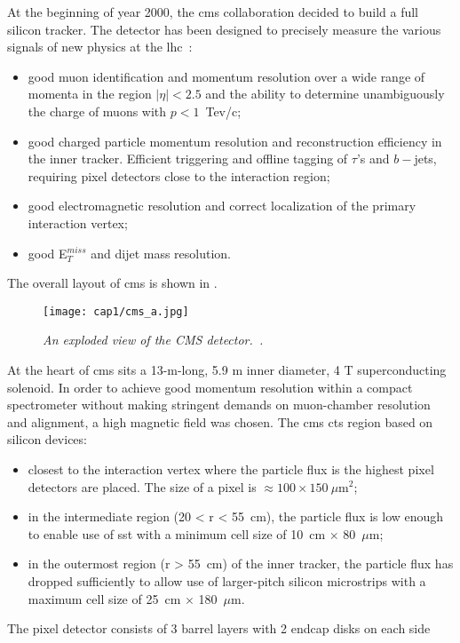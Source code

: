 \hskip 1cm At the beginning of year 2000, the \gls{cms} collaboration decided to
build a full silicon tracker. The detector has been designed to precisely
measure the various signals of new physics at the \gls{lhc}~\cite{Perries}:
\begin{itemize}
\item good muon identification and momentum resolution over a wide range of
  momenta in the region $|\eta|<2.5$ and the ability to determine unambiguously
  the charge of muons with $p < 1$~Tev/c;
\item good charged particle momentum resolution and reconstruction efficiency in
  the inner tracker. Efficient triggering and offline tagging of $\tau$'s and
  $b-$jets, requiring pixel detectors close to the interaction region;
\item good electromagnetic resolution and correct localization of the primary
  interaction vertex;
\item good E$^{miss}_T$ and dijet mass resolution.
\end {itemize}
The overall layout of \gls{cms} is shown in .
\begin{figure}[!htbp]
  \centering
  \texttt{[image: cap1/cms\_a.jpg]}
  \caption{\textit{An exploded view of the CMS
      detector.~\cite{CMS_tech}.}}\label{cms_a}
\end{figure}
At the heart of \gls{cms} sits a 13-m-long, 5.9 m inner diameter, 4 T
superconducting solenoid. In order to achieve good momentum resolution within a
compact spectrometer without making stringent demands on muon-chamber resolution
and alignment, a high magnetic field was chosen.  The \gls{cms} \gls{cts} region
based on silicon devices:
\begin{itemize}
\item closest to the interaction vertex where the particle flux is the highest
  pixel detectors are placed. The size of a pixel is
  $\approx 100 \times 150~\mu$m$^2$;
\item in the intermediate region (20 < r < 55~cm), the particle flux is low
  enough to enable use of \gls{sst} with a minimum cell size of 10~cm $\times$
  80~$\mu$m;
\item in the outermost region (r > 55~cm) of the inner tracker, the particle
  flux has dropped sufficiently to allow use of larger-pitch silicon microstrips
  with a maximum cell size of 25~cm $\times$ 180~$\mu$m.
\end{itemize}
The pixel detector consists of 3 barrel layers with 2 endcap disks on each side
